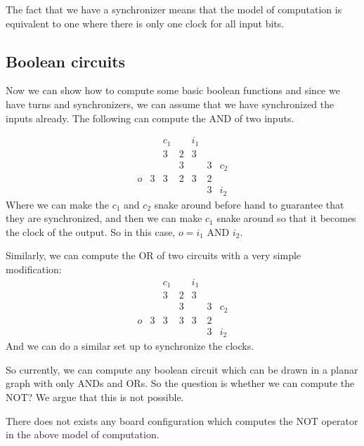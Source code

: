 \documentclass[runningheads,a4paper]{llncs}
\begin{document}
The fact that we have a synchronizer means that the model of computation is equivalent to one where there is only one clock for all input bits. 

\subsection{Boolean circuits}

Now we can show how to compute some basic boolean functions and since we have turns and synchronizers, we can assume that we have synchronized the inputs already. The following can compute the AND of two inputs. 

\[ \begin{array}{cccccccc}    &    & c_1&   &  i_1 &     &  \\
					   &    & 3   & 2 &  3    &    &  \\
					   &    &    & 3 &    & 3 & c_2 \\
					o & 3 & 3 & 2 & 3 & 2 & 	    \\
					   &    &    &    &    & 3 & i_2 \end{array} \]
Where we can make the $c_1$ and $c_2$ snake around before hand to guarantee that they are synchronized, and then we can make $c_1$ snake around so that it becomes the clock of the output. So in this case, $o = i_1$ AND $i_2$.

Similarly, we can compute the OR of two circuits with a very simple modification:
\[ \begin{array}{cccccccc}    &    & c_1&   &  i_1 &     &  \\
					   &    & 3   & 2 &  3    &    &  \\
					   &    &    & 3 &    & 3 & c_2 \\
					o & 3 & 3 & 3 & 3 & 2 & 	    \\
					   &    &    &    &    & 3 & i_2 \end{array} \]
And we can do a similar set up to synchronize the clocks. 

So currently, we can compute any boolean circuit which can be drawn in a planar graph with only ANDs and ORs. So the question is whether we can compute the NOT? We argue that this is not possible. 

\begin{theorem}
There does not exists any board configuration which computes the NOT operator in the above model of computation.
\end{theorem}
\end{document}
